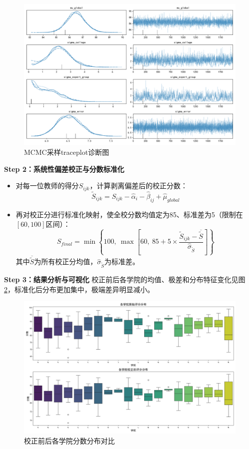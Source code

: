 \documentclass[withoutpreface,bwprint]{cumcmthesis}
\begin{document}
\begin{figure}[H]
\centering
\includegraphics[width=1\textwidth]{figures/Diagnostics/trace_plots.png}
\caption{MCMC采样traceplot诊断图}
\label{fig:trace_plots}
\end{figure}

\textbf{Step 2：系统性偏差校正与分数标准化}
\begin{itemize}
    \item 对每一位教师的得分$S_{ijk}$，计算剥离偏差后的校正分数：
    $$
    \widetilde{S}_{ijk} = S_{ijk} - \widehat{\alpha}_i - \widehat{\beta}_{ij} + \widehat{\mu}_{global}
    $$
    \item 再对校正分进行标准化映射，使全校分数均值定为85、标准差为5（限制在$[60,100]$区间）：
    $$
    S_{final} = \min \left\{100,\ \max\left[60,\ 85 + 5 \times \frac{\widetilde{S}_{ijk} - \overline{\widetilde{S}}}{\widehat{\sigma}_{\widetilde{S}}}\right]\right\}
    $$
    其中$\overline{\widetilde{S}}$为所有校正分均值，$\widehat{\sigma}_{\widetilde{S}}$为标准差。
\end{itemize}

\textbf{Step 3：结果分析与可视化}
校正前后各学院的均值、极差和分布特征变化见图\ref{fig:college_scores_comparison}，标准化后分布更加集中，极端差异明显减小。

\begin{figure}[H]
\centering
\includegraphics[width=1\textwidth]{figures/Results_Visualization/college_scores_comparison.png}
\caption{校正前后各学院分数分布对比}
\label{fig:college_scores_comparison}
\end{figure}
\end{document}
